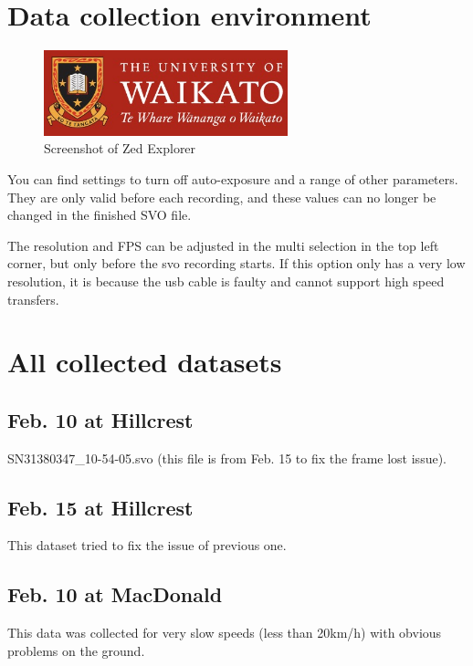  
\section{Data collection environment}
 

\begin{figure}[htbp]
  \centerline{\includegraphics[width=200pt]{images/UoW.jpg}}
  \caption{Screenshot of Zed Explorer }
  \label{zede}
\end{figure} 

You can find settings to turn off auto-exposure and a range of other parameters.
They are only valid before each recording, and these values can no longer be changed in the finished SVO file.

The resolution and FPS can be adjusted in the multi selection in the top left corner, but only before the svo recording starts. 
If this option only has a very low resolution, it is because the usb cable is faulty and cannot support high speed transfers.

\section{All collected datasets}

 
\subsection{Feb. 10 at Hillcrest}
 
SN31380347\_10-54-05.svo (this file is from Feb. 15 to fix the frame lost issue).

\subsection{Feb. 15 at Hillcrest}

This dataset tried to fix the issue of previous one. 

\subsection{Feb. 10 at MacDonald}

This data was collected for very slow speeds (less than 20km/h) with obvious problems on the ground.

